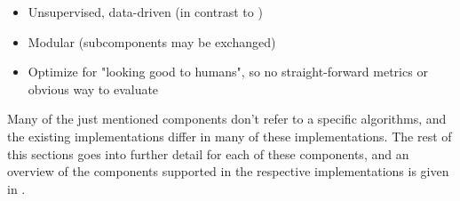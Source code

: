 \begin{itemize}
	\item Unsupervised, data-driven (in contrast to \textcite{VISR12})
	\item Modular (subcomponents may be exchanged)
	\item Optimize for "looking good to humans", so no straight-forward metrics or obvious way to evaluate
\end{itemize}
\newline

Many of the just mentioned components don't refer to a specific algorithms, and the existing implementations \mainalgos differ in many of these implementations. The rest of this sections goes into further detail for each of these components, and an overview of the components supported in the respective implementations is given in .
\newline




